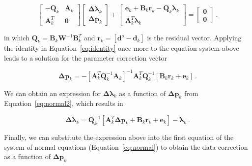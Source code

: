 \begin{equation}
  \begin{bmatrix}
    -\mathbf{Q}_k & \mathbf{A}_k \\
    \mathbf{A}_k^T & \mathbf{0}
  \end{bmatrix}
  \begin{bmatrix}
    \boldsymbol{\Delta\lambda}_k \\
    \mathbf{\Delta p}_k
  \end{bmatrix}
  +
  \begin{bmatrix}
    \mathbf{e}_k + \mathbf{B}_k\mathbf{r}_k
    - \mathbf{Q}_k \boldsymbol{\lambda}_k
    \\
    \mathbf{A}_k^T\boldsymbol{\lambda}_k
  \end{bmatrix}
  =
  \begin{bmatrix}
    \mathbf{0}
    \\
    \mathbf{0}
  \end{bmatrix}
  \label{eq:normal2}
  \ .
\end{equation}

\noindent
in which $\mathbf{Q}_k = \mathbf{B}_k\mathbf{W}^{-1}\mathbf{B}_k^T$ and
$\mathbf{r}_k = \left[\mathbf{d}^o - \mathbf{d}_k\right]$ is the residual
vector.
Applying the identity in Equation~\ref{eq:identity} once more to the equation
system above leads to a solution for the parameter correction vector

\begin{equation}
  \mathbf{\Delta p}_k =
  -\left[\mathbf{A}_k^T\mathbf{Q}_k^{-1}\mathbf{A}_k\right]^{-1}
  \mathbf{A}_k^T\mathbf{Q}_k^{-1}
  \left[\mathbf{B}_k\mathbf{r}_k + \mathbf{e}_k\right]
  \ .
  \label{eq:deltap}
\end{equation}

We can obtain an expression for $\boldsymbol{\Delta\lambda}_k$ as a function of
$\mathbf{\Delta p}_k$ from Equation~\ref{eq:normal2}, which results in

\begin{equation}
  \boldsymbol{\Delta\lambda}_k =
  \mathbf{Q}_k^{-1}
  \left[\mathbf{A}_k^T\mathbf{\Delta p}_k + \mathbf{B}_k\mathbf{r}_k + \mathbf{e}_k\right]
  -\boldsymbol{\lambda}_k
  \ .
  \label{eq:deltalambda}
\end{equation}

\noindent
Finally, we can substitute the expression above into the first equation of the
system of normal equations (Equation~\ref{eq:normal}) to obtain the data
correction as a function of $\mathbf{\Delta p}_k$

